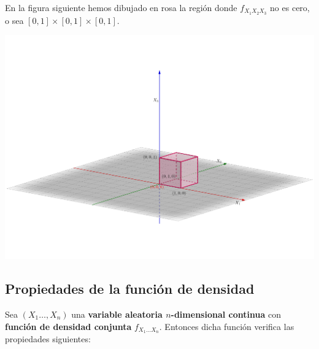 \documentclass[]{book}
\begin{document}
En la figura siguiente hemos dibujado en rosa la región donde \(f_{X_1X_2X_3}\) no es cero, o sea \([0,1]\times [0,1]\times [0,1]\).

\includegraphics{Images/Cubo3D2.png}

\hypertarget{propiedades-de-la-funciuxf3n-de-densidad-1}{%
\subsection{Propiedades de la función de densidad}\label{propiedades-de-la-funciuxf3n-de-densidad-1}}

Sea \((X_1\ldots,X_n)\) una \textbf{variable aleatoria \(n\)-dimensional continua} con \textbf{función de densidad conjunta} \(f_{X_1\ldots X_n}\). Entonces dicha función verifica las propiedades siguientes:
\end{document}
